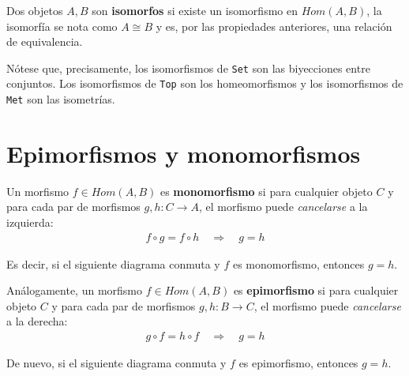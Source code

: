\documentclass[11pt, fleqn, spanish]{book}
\begin{document}
    Dos objetos $A,B$ son \textbf{isomorfos} si existe un isomorfismo en $Hom(A,B)$, la isomorfía se
    nota como $A \cong B$ y es, por las propiedades anteriores, una relación de equivalencia.
      
    Nótese que, precisamente, los isomorfismos de \texttt{Set} son las biyecciones entre conjuntos.
    Los isomorfismos de \texttt{Top} son los homeomorfismos y los isomorfismos de \texttt{Met} son
    las isometrías.
    
  \section {Epimorfismos y monomorfismos}
    \begin{definition} 
      Un morfismo $f \in Hom(A,B)$ es \textbf{monomorfismo} si para cualquier objeto $C$ y
      para cada par de morfismos $g,h: C \rightarrow A$, el morfismo puede \textit{cancelarse} a la izquierda:
      \begin{gather*}
	f \circ g = f \circ h \quad \Rightarrow \quad g = h
      \end{gather*}
    \end{definition}

    Es decir, si el siguiente diagrama conmuta y $f$ es monomorfismo, entonces $g=h$.
    \begin{center}
    \end{center}
    
    \begin{definition} 
      Análogamente, un morfismo $f \in Hom(A,B)$ es \textbf{epimorfismo} si para cualquier objeto $C$ y
      para cada par de morfismos $g,h: B \rightarrow C$, el morfismo puede \textit{cancelarse} a la derecha:
      \begin{gather*}
	g \circ f = h \circ f \quad \Rightarrow \quad g = h
      \end{gather*}
    \end{definition}

    De nuevo, si el siguiente diagrama conmuta y $f$ es epimorfismo, entonces $g=h$.
    \begin{center}
    \end{center}
    
\end{document}
